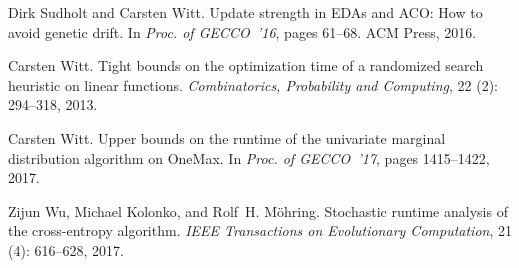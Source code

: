 \documentclass[11pt, a4paper]{article}
\begin{document}
\begin{thebibliography}{29}
Dirk Sudholt and Carsten Witt.
\newblock Update strength in {EDA}s and {ACO}: How to avoid genetic drift.
\newblock In \emph{Proc. of GECCO~'16}, pages 61--68. ACM Press, 2016.

Carsten Witt.
\newblock Tight bounds on the optimization time of a randomized search
  heuristic on linear functions.
\newblock \emph{Combinatorics, Probability and Computing}, 22
  (2): 294--318, 2013.

Carsten Witt.
\newblock Upper bounds on the runtime of the univariate marginal distribution
  algorithm on {OneMax}.
\newblock In \emph{Proc. of GECCO~'17}, pages 1415--1422, 2017.

Zijun Wu, Michael Kolonko, and Rolf~H. M{\"o}hring.
\newblock Stochastic runtime analysis of the cross-entropy algorithm.
\newblock \emph{IEEE Transactions on Evolutionary Computation}, 21
  (4): 616--628, 2017.

\end{thebibliography}
%
\end{document}
